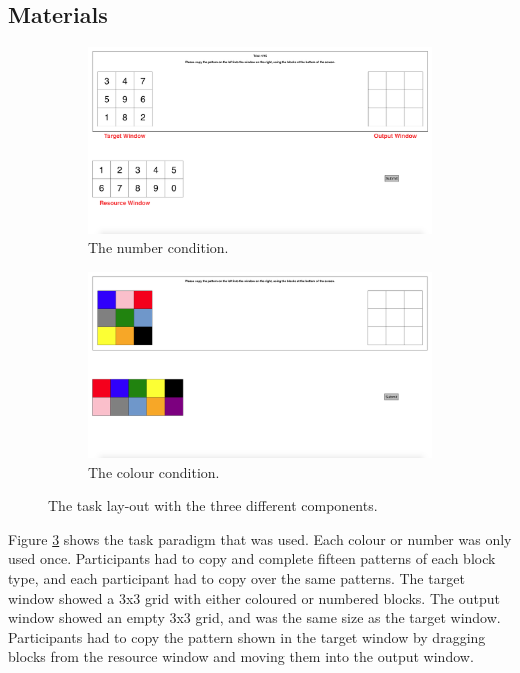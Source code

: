 \documentclass[11pt,oneside]{report}
\begin{document}
\subsection{Materials}
\begin{figure}[]
\begin{center}

\begin{subfigure}[b]{\textwidth}
\centerline{\includegraphics[scale=0.23]{images/Study2/ch4_numbers.png}}
\caption{The number condition.}
\label{fig:ch4_BWT}
\end{subfigure}
\begin{subfigure}[b]{0.5\textwidth}
\centerline{\includegraphics[scale=0.23]{images/Study2/ch4_colours.png}}
\caption{The colour condition.}
\label{fig:ch4_NWT}
\end{subfigure}
\caption{The task lay-out with the three different components.}
\label{fig:ch4_taskparadigm}
\end{center}
\end{figure}

Figure \ref{fig:ch4_taskparadigm} shows the task paradigm that was used. Each colour or number was only used once. Participants had to copy and complete fifteen patterns of each block type, and each participant had to copy over the same patterns. The target window showed a 3x3 grid with either coloured or numbered blocks. The output window showed an empty 3x3 grid, and was the same size as the target window. Participants had to copy the pattern shown in the target window by dragging blocks from the resource window and moving them into the output window. 
\end{document}
